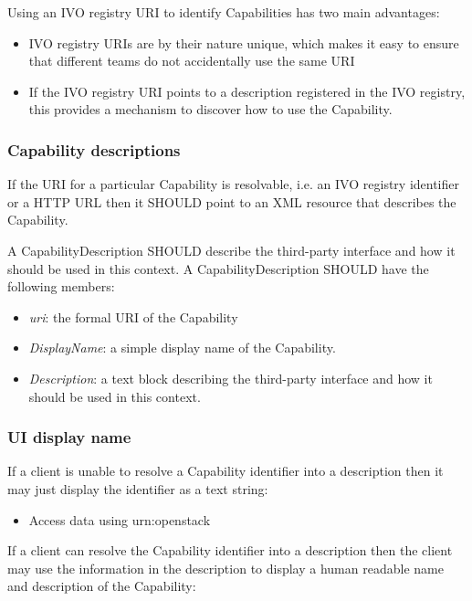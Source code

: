 \documentclass[11pt,a4paper]{ivoa}
\begin{document}
Using an IVO registry URI to identify Capabilities has two main advantages:

\begin{itemize}
    \item IVO registry URIs are by their nature unique, which makes it easy to ensure that different teams do not accidentally use the same URI
    \item If the IVO registry URI points to a description registered in the IVO registry, this provides a mechanism to discover how to use the Capability.
\end{itemize}

\subsubsection{Capability descriptions}
\label{subsubsec:capability descriptions}
If the URI for a particular Capability is resolvable, i.e. an IVO registry identifier or a HTTP URL then it SHOULD point to an XML resource that describes the Capability.

A CapabilityDescription SHOULD describe the third-party interface and how it should be used in this context. A CapabilityDescription SHOULD have the following members:

\begin{itemize}
    \item \emph{uri}: the formal URI of the Capability
    \item \emph{DisplayName}: a simple display name of the Capability.
    \item \emph{Description}: a text block describing the third-party interface and how it should be used in this context.
\end{itemize}

\subsubsection{UI display name}
\label{subsubsection:ui display ame}
If a client is unable to resolve a Capability identifier into a description then it may just display the identifier as a text string:

\begin{itemize}
    \item Access data using urn:openstack
\end{itemize}

If a client can resolve the Capability identifier into a description then the client may use the information in the description to display a human readable name and description of the Capability:
\end{document}
